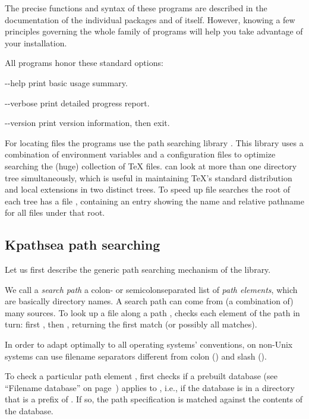 \documentclass{article}
\begin{document}
\noindent The precise functions and syntax of these programs are
described in the documentation of the individual packages and of \Webc{}
itself.  However, knowing a few principles governing the whole family of
programs will help you take advantage of your \Webc{} installation.

All programs honor these standard  options:
\begin{ttdescription}
\item[-{}-help] print basic usage summary.
\item[-{}-verbose] print detailed progress report.
\item[-{}-version] print version information, then exit.
\end{ttdescription}

For locating files the \Webc{} programs use the path searching library
\KPS{}. This library uses a combination of environment variables and a
configuration files to optimize searching the (huge) collection of
\TeX{} files.  \Webc{} can look at more than one directory tree
simultaneously, which is useful in maintaining \TeX's standard
distribution and local extensions in two distinct trees. To speed up
file searches the root of each tree has a file , containing
an entry showing the name and relative pathname for all files under that
root.

\subsection{Kpathsea path searching}

Let us first describe the generic path searching mechanism of the \KPS{}
library. 

We call a \emph{search path} a colon- or semicolon\hyph sepa\-rated list
of \emph{path elements}, which are basically directory names.  A
search path can come from (a combination of) many sources.  To look up
a file  along a path , \KPS{} checks each
element of the path in turn: first , then
, returning the first match (or possibly all
matches).

In order to adapt optimally to all operating systems' conventions, on
non-Unix systems \KPS{} can use filename separators different from
colon (\samp{:}) and slash (\samp{/}).

To check a particular path element , \KPS{} first checks if a
prebuilt database (see ``Filename data\-base'' on 
page~\pageref{Filename-database}) applies to , i.e., if the database
is in a directory that is a prefix of .  If so, the path
specification is matched against the contents of the database.
\end{document}
